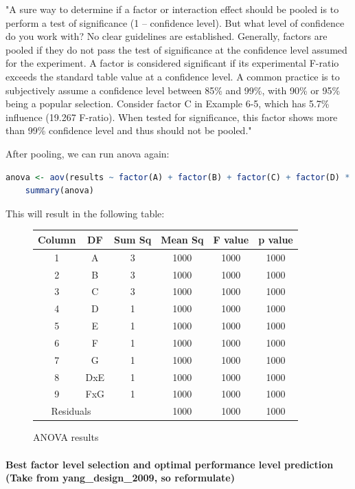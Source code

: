 "A sure way to determine if a factor or interaction effect should be pooled is to perform a test of significance (1 – confidence level). But what level of confidence do you work with? No clear guidelines are established. Generally, factors are pooled if they do not pass the test of significance at the confidence level assumed for the experiment. A factor is considered significant if its experimental F-ratio exceeds the standard table value at a confidence level. A common practice is to subjectively assume a confidence level between 85\% and 99\%, with 90\% or 95\% being a popular selection. Consider factor C in Example 6-5, which has 5.7\% influence (19.267 F-ratio). When tested for significance, this factor shows more than 99\% confidence level and thus should not be pooled."\cite{roy_primer_1990}

After pooling, we can run anova again:
\begin{lstlisting}[language=R]
	anova <- aov(results ~ factor(A) + factor(B) + factor(C) + factor(D) * factor(E) + factor(F) * factor(G), data = taguchi.combined_pivoted)
	summary(anova)
\end{lstlisting}

This will result in the following table:

\begin{figure}[H]
	\centering
	\begin{tabular}{ |cccccc|  }
		\hline
		Column 		& DF & Sum Sq & Mean Sq & F value & p value\\
		\hline
		1  & A 		& 3 & 1000 & 1000 & 1000\\
		2  & B 		& 3 & 1000 & 1000 & 1000\\
		3  & C 		& 3 & 1000 & 1000 & 1000\\
		4  & D 		& 1 & 1000 & 1000 & 1000\\
		5  & E 		& 1 & 1000 & 1000 & 1000\\
		6  & F 		& 1 & 1000 & 1000 & 1000\\
		7  & G 		& 1 & 1000 & 1000 & 1000\\
		8  & DxE 	& 1 & 1000 & 1000 & 1000\\
		9  & FxG 	& 1 & 1000 & 1000 & 1000\\
		\hline
		\multicolumn{2}{|c}{Residuals} &  & 1000 & 1000 & 1000\\
		\hline
	\end{tabular}
	\caption{ANOVA results}
\end{figure}

\paragraph{Best factor level selection and optimal performance level prediction (Take from yang\_design\_2009, so reformulate)}


